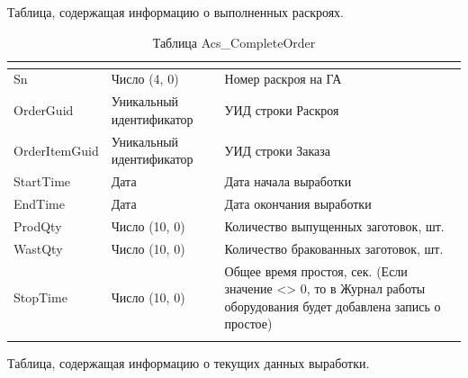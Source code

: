 Таблица, содержащая информацию о выполненных раскроях.

\scriptsize
\begin{longtable}{|p{56mm}|p{56mm}|p{56mm}|}
\hline
{\bf \parbox[c][5mm]{56mm}{}} & {\bf \parbox[c]{56mm}{}} & {\bf \parbox[c]{56mm}{}} \\
\hline
\parbox[c][5mm]{56mm}{Sn} & \parbox{56mm}{Число (4, 0)} & \parbox{56mm}{Номер раскроя на ГА} \\
\hline
\parbox[c][5mm]{56mm}{OrderGuid} & \parbox{56mm}{Уникальный идентификатор} & \parbox{56mm}{УИД строки Раскроя} \\
\hline
\parbox[c][5mm]{56mm}{OrderItemGuid} & \parbox{56mm}{Уникальный идентификатор} & \parbox{56mm}{УИД строки Заказа} \\
\hline
\parbox[c][5mm]{56mm}{StartTime} & \parbox{56mm}{Дата} & \parbox{56mm}{Дата начала выработки} \\
\hline
\parbox[c][5mm]{56mm}{EndTime} & \parbox{56mm}{Дата} & \parbox{56mm}{Дата окончания выработки} \\
\hline
\parbox[c][10mm]{56mm}{ProdQty} & \parbox{56mm}{Число (10, 0)} & \parbox{56mm}{Количество выпущенных заготовок, шт.} \\
\hline
\parbox[c][10mm]{56mm}{WastQty} & \parbox{56mm}{Число (10, 0)} & \parbox{56mm}{Количество бракованных заготовок, шт.} \\
\hline
\parbox[c][26mm]{56mm}{StopTime} & \parbox{56mm}{Число (10, 0)} & \parbox{56mm}{Общее время простоя, сек.
(Если значение <> 0, то в Журнал работы оборудования будет добавлена запись о простое)} \\
\hline
\caption{Таблица Acs\_CompleteOrder} \label{tab:Acs_CompleteOrder}
\end{longtable}  
\normalsize

 
 


Таблица, содержащая информацию о текущих данных выработки.

